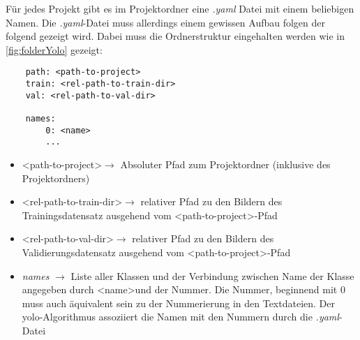 Für jedes Projekt gibt es im Projektordner eine \textit{.yaml} Datei mit einem beliebigen Namen. Die \textit{.yaml}-Datei muss allerdings einem gewissen Aufbau folgen der folgend gezeigt wird. Dabei muss die Ordnerstruktur eingehalten werden wie in \autoref{fig:folderYolo} gezeigt:
\begin{verbatim}
    path: <path-to-project>
    train: <rel-path-to-train-dir>
    val: <rel-path-to-val-dir>

    names:
        0: <name>
        ...
\end{verbatim}
\begin{itemize}
\item \textless path-to-project\textgreater  $\rightarrow$ Absoluter Pfad zum Projektordner (inklusive des Projektordners)
\item \textless rel-path-to-train-dir\textgreater  $\rightarrow$ relativer Pfad zu den Bildern des Trainingsdatensatz ausgehend vom \textless path-to-project\textgreater-Pfad
\item \textless rel-path-to-val-dir\textgreater  $\rightarrow$ relativer Pfad zu den Bildern des Validierungsdatensatz ausgehend vom \textless path-to-project\textgreater-Pfad
\item \textit{names} $\rightarrow$ Liste aller Klassen und der Verbindung zwischen Name der Klasse angegeben durch \textless name\textgreater  und der Nummer. Die Nummer, beginnend mit 0 muss auch äquivalent sein zu der Nummerierung in den Textdateien. Der \ac{yolo}-Algorithmus assoziiert die Namen mit den Nummern durch die \textit{.yaml}-Datei
\end{itemize}
